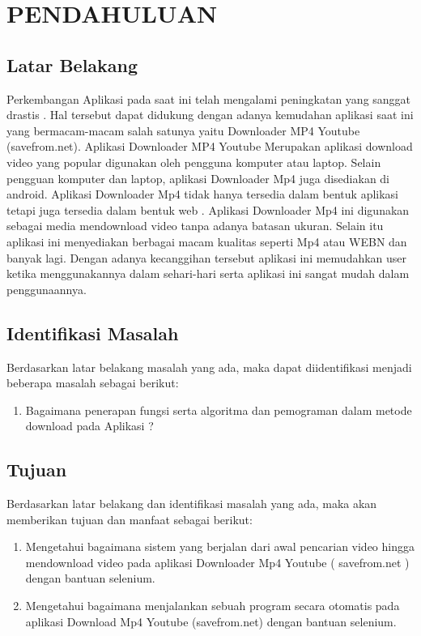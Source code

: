 \chapter{PENDAHULUAN}

\section{Latar Belakang}
Perkembangan Aplikasi pada saat ini telah mengalami peningkatan yang sanggat drastis \cite{neyfa2016perancangan}. Hal tersebut dapat didukung dengan adanya kemudahan aplikasi saat ini yang bermacam-macam salah satunya yaitu Downloader MP4 Youtube (savefrom.net). Aplikasi Downloader MP4 Youtube Merupakan aplikasi download video yang popular digunakan oleh pengguna komputer atau laptop. Selain pengguan komputer dan laptop, aplikasi Downloader Mp4 juga disediakan di android. Aplikasi Downloader Mp4 tidak hanya tersedia dalam bentuk aplikasi tetapi juga tersedia dalam bentuk web \cite{neyfa2016perancangan} . Aplikasi Downloader Mp4 ini digunakan sebagai media mendownload video tanpa adanya batasan ukuran. Selain itu aplikasi ini menyediakan berbagai macam kualitas  seperti Mp4 atau WEBN dan banyak lagi. Dengan adanya kecanggihan tersebut aplikasi ini memudahkan user ketika menggunakannya dalam sehari-hari serta aplikasi ini sangat mudah dalam penggunaannya. 


\section{Identifikasi Masalah}
Berdasarkan latar belakang masalah yang ada, maka dapat diidentifikasi menjadi beberapa masalah sebagai berikut:
\begin{enumerate}
\item Bagaimana penerapan fungsi serta algoritma dan pemograman dalam metode download pada Aplikasi ?
\end{enumerate}

\section{Tujuan}
Berdasarkan latar belakang dan identifikasi masalah yang ada, maka akan memberikan tujuan dan manfaat sebagai berikut:
\begin{enumerate}
\item Mengetahui bagaimana sistem yang berjalan dari awal pencarian video hingga mendownload video pada  aplikasi Downloader Mp4 Youtube ( savefrom.net ) dengan bantuan selenium.
\item Mengetahui bagaimana menjalankan sebuah program secara otomatis pada aplikasi Download Mp4 Youtube (savefrom.net) dengan bantuan selenium.
\end{enumerate}

